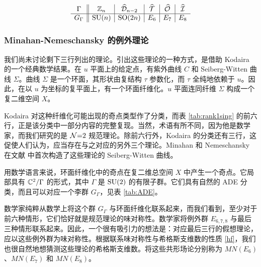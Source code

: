 \begin{table}
\[
\begin{array}{c||c|c|c|c|c}
\Gamma&\mathbb{Z}_n&\widehat{\mathcal D}_{n-2}&\widehat{\mathcal T}&\widehat{\mathcal O}&\widehat{\mathcal I}\\
\hline
G_\Gamma&\mathop{\mathrm{SU}}(n)&\mathop{\mathrm{SO}}(2n)&E_6&E_7&E_8
\end{array}
\]
\caption{$\SU(2)$ 的有限子群 $\Gamma$ 与单链李群 $G_\Gamma$。这里，$\mathcal D_n$ 是作用于正 $n$ 边形的二面体群，$\mathcal T$、$\mathcal O$、$\mathcal I$ 分别是四面体群、八面体群和二十面体群，上方的帽号表示从 $\SO(3)$ 到 $\SU(2)$ 的提升。例如，得到的群 $\widehat{\mathcal T}$ 称为二元四面体群。\label{tab:ADE}}
\end{table}

\subsubsection{Minahan-Nemeschansky 的例外理论}\label{sec:F}
我们尚未讨论剩下三行列出的理论。引出这些理论的一种方式，是借助 Kodaira 的一个经典数学结果。在 $u$ 平面上的给定点，有紫外曲线 $C$ 和 Seiberg-Witten 曲线 $\Sigma$。曲线 $\Sigma$ 是一个环面，其形状由复结构 $\tau$ 参数化，而 $\tau$ 全纯地依赖于 $u$。因此，在以 $u$ 为坐标的复平面上，有一个环面纤维化。$u$ 平面连同纤维 $\Sigma$ 构成一个复二维空间 $X$。

Kodaira 对这种纤维化可能出现的奇点类型作了分类，而表 \ref{tab:rank1sing} 的前六行，正是该分类中一部分内容的完整复现。当然，术语有所不同，因为他是数学家，而我们研究的是 $\mathcal{N}{=}2$ 规范理论。除前六行外，Kodaira 的分类还有三行，这促使人们认为，应当存在与之对应的另外三个理论。Minahan 和 Nemeschansky 在文献 \cite{Minahan:1996fg,Minahan:1996cj} 中首次构造了这些理论的 Seiberg-Witten 曲线。

用数学语言来说，环面纤维化中的奇点在复二维总空间 $X$ 中产生一个奇点。它局部具有 $\mathbb{C}^2/\Gamma$ 的形式，其中 $\Gamma$ 是 $\SU(2)$ 的有限子群。它们具有自然的 ADE 分类，而且可以对应一个李群 $G_\Gamma$，见表 \ref{tab:ADE}。

数学家纯粹从数学上将这个群 $G_\Gamma$ 与环面纤维化联系起来，而我们看到，至少对于前六种情形，它们恰好就是规范理论的味对称性。数学家将例外群 $E_{6,7,8}$ 与最后三种情形联系起来。因此，一个很有吸引力的想法是：对应最后三行的假想理论，应以这些例外群为味对称性。根据联系味对称性与希格斯支维数的性质 \eqref{hf}，我们也很自然地想猜测这些理论的希格斯支维数。将这些共形场论分别称为 $MN(E_6)$、$MN(E_7)$ 和 $MN(E_8)$。

